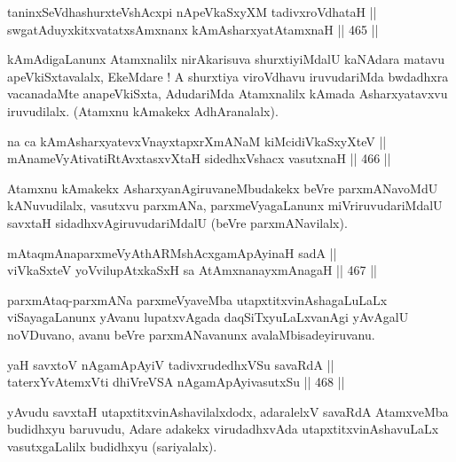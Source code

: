 \begin{shl}
taninxSeVdhashurxteVshAcxpi nApeVkaSxyXM tadivxroVdhataH || \\
swgatAduyxkitxvatatxsAmxnanx kAmAsharxyatA\s \s tamxnaH \hfill || 465 ||  
\end{shl}

\begin{artha}
kAmAdigaLanunx Atamxnalilx nirAkarisuva shurxtiyiMdalU kaNAdara matavu
apeVkiSxtavalalx, EkeMdare ! A shurxtiya viroVdhavu iruvudariMda
bwdadhxra vacanadaMte anapeVkiSxta, AdudariMda Atamxnalilx kAmada
Asharxyatavxvu iruvudilalx. (Atamxnu kAmakekx AdhAranalalx).
\end{artha}

\begin{shl}
na ca kAmAsharxyatevxV\s nayxtapxrXmANaM kiMcidiVkaSxyXteV || \\
mAnameVyAtivatiRtAvxtasxvXtaH sidedhxVshacx vasutxnaH \hfill || 466 ||  
\end{shl}

\begin{artha}
Atamxnu kAmakekx AsharxyanAgiruvaneMbudakekx beVre parxmANavoMdU
kANuvudilalx, vasutxvu parxmANa, parxmeVyagaLanunx miVriruvudariMdalU
savxtaH sidadhxvAgiruvudariMdalU (beVre parxmANavilalx).
\end{artha}

\begin{shl}
mAtaqmAnaparxmeVyAthARMshAcx\s \s gamApAyinaH sadA || \\
viVkaSxteV yoV\s vilupAtxkaSxH sa AtAmx\s nanayxmAnagaH \hfill || 467 ||  
\end{shl}

\begin{artha}
parxmAtaq-parxmANa parxmeVyaveMba utapxtitxvinAshagaLuLaLx
viSayagaLanunx yAvanu lupatxvAgada daqSiTxyuLaLxvanAgi yAvAgalU
noVDuvano, avanu beVre parxmANavanunx avalaMbisadeyiruvanu.
\end{artha}

\begin{shl}
yaH savxtoV nA\s \s gamApAyiV tadivxrudedhxVSu savaRdA || \\
taterxYvA\s \s temxVti dhiVreVSA nA\s \s gamApAyivasutxSu \hfill || 468 ||  
\end{shl}

\begin{artha}
yAvudu savxtaH utapxtitxvinAshavilalxdodx, adaralelxV savaRdA
AtamxveMba budidhxyu baruvudu, Adare adakekx virudadhxvAda
utapxtitxvinAshavuLaLx vasutxgaLalilx budidhxyu (sariyalalx).
\end{artha} 

